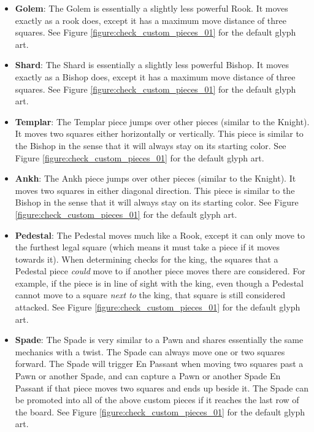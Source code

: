 \begin{itemize}\itemsep0em
	\item \textbf{Golem}: The Golem is essentially a slightly less powerful Rook. It moves exactly as a rook does, except it has a maximum move distance of three squares. See Figure \ref{figure:check_custom_pieces_01} for the default glyph art.
	\item \textbf{Shard}: The Shard is essentially a slightly less powerful Bishop. It moves exactly as a Bishop does, except it has a maximum move distance of three squares. See Figure \ref{figure:check_custom_pieces_01} for the default glyph art.
	\item \textbf{Templar}: The Templar piece jumps over other pieces (similar to the Knight). It moves two squares either horizontally or vertically. This piece is similar to the Bishop in the sense that it will always stay on its starting color. See Figure \ref{figure:check_custom_pieces_01} for the default glyph art.
	\item \textbf{Ankh}: The Ankh piece jumps over other pieces (similar to the Knight). It moves two squares in either diagonal direction. This piece is similar to the Bishop in the sense that it will always stay on its starting color. See Figure \ref{figure:check_custom_pieces_01} for the default glyph art.
	\item \textbf{Pedestal}: The Pedestal moves much like a Rook, except it can only move to the furthest legal square (which means it must take a piece if it moves towards it). When determining checks for the king, the squares that a Pedestal piece \textit{could} move to if another piece moves there are considered. For example, if the piece is in line of sight with the king, even though a Pedestal cannot move to a square \textit{next to} the king, that square is still considered attacked. See Figure \ref{figure:check_custom_pieces_01} for the default glyph art.
	\item \textbf{Spade}: The Spade is very similar to a Pawn and shares essentially the same mechanics with a twist. The Spade can always move one or two squares forward. The Spade will trigger En Passant when moving two squares past a Pawn or another Spade, and can capture a Pawn or another Spade En Passant if that piece moves two squares and ends up beside it. The Spade can be promoted into all of the above custom pieces if it reaches the last row of the board. See Figure \ref{figure:check_custom_pieces_01} for the default glyph art.
\end{itemize}














